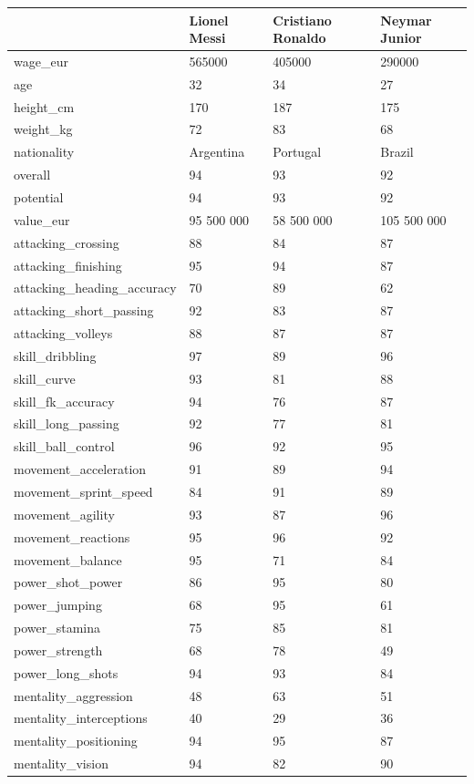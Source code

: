 \documentclass[
]{scrbook}
\begin{document}
\begin{longtable}[]{@{}llll@{}}
\toprule
& Lionel Messi & Cristiano Ronaldo & Neymar Junior \\
\midrule
\endhead
wage\_eur & 565000 & 405000 & 290000 \\
age & 32 & 34 & 27 \\
height\_cm & 170 & 187 & 175 \\
weight\_kg & 72 & 83 & 68 \\
nationality & Argentina & Portugal & Brazil \\
overall & 94 & 93 & 92 \\
potential & 94 & 93 & 92 \\
value\_eur & 95 500 000 & 58 500 000 & 105 500 000 \\
attacking\_crossing & 88 & 84 & 87 \\
attacking\_finishing & 95 & 94 & 87 \\
attacking\_heading\_accuracy & 70 & 89 & 62 \\
attacking\_short\_passing & 92 & 83 & 87 \\
attacking\_volleys & 88 & 87 & 87 \\
skill\_dribbling & 97 & 89 & 96 \\
skill\_curve & 93 & 81 & 88 \\
skill\_fk\_accuracy & 94 & 76 & 87 \\
skill\_long\_passing & 92 & 77 & 81 \\
skill\_ball\_control & 96 & 92 & 95 \\
movement\_acceleration & 91 & 89 & 94 \\
movement\_sprint\_speed & 84 & 91 & 89 \\
movement\_agility & 93 & 87 & 96 \\
movement\_reactions & 95 & 96 & 92 \\
movement\_balance & 95 & 71 & 84 \\
power\_shot\_power & 86 & 95 & 80 \\
power\_jumping & 68 & 95 & 61 \\
power\_stamina & 75 & 85 & 81 \\
power\_strength & 68 & 78 & 49 \\
power\_long\_shots & 94 & 93 & 84 \\
mentality\_aggression & 48 & 63 & 51 \\
mentality\_interceptions & 40 & 29 & 36 \\
mentality\_positioning & 94 & 95 & 87 \\
mentality\_vision & 94 & 82 & 90 \\

\end{longtable}
\end{document}
